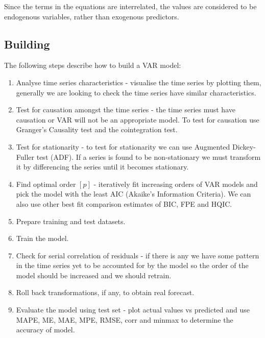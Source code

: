 \documentclass[11pt]{article}
\begin{document}
Since the terms in the equations are interrelated, the values are considered to be endogenous variables, rather than exogenous predictors.

\subsection{Building}
The following steps describe how to build a VAR model:

\vspace{-0.25cm}
\begin{enumerate}
	\itemsep-0.2cm
	\item Analyse time series characteristics - visualise the time series by plotting them, generally we are looking to check the time series have similar characteristics.
	\item Test for causation amongst the time series - the time series must have causation or VAR will not be an appropriate model. To test for causation use Granger's Causality test and the cointegration test.
	\item Test for stationarity - to test for stationarity we can use Augmented Dickey-Fuller test (ADF). If a series is found to be non-stationary we must transform it by differencing the series until it becomes stationary.
	\item Find optimal order $[p]$ - iteratively fit increasing orders of VAR models and pick the model with the least AIC (Akaike’s Information Criteria). We can also use other best fit comparison estimates of BIC, FPE and HQIC.
	\item Prepare training and test datasets.
	\item Train the model.
	\item Check for serial correlation of residuals -  if there is any we have some pattern in the time series yet to be accounted for by the model so the order of the model should be increased and we should retrain.
	\item Roll back transformations, if any, to obtain real forecast.
	\item Evaluate the model using test set - plot actual values vs predicted and use MAPE, ME, MAE, MPE, RMSE, corr and minmax to determine the accuracy of model.
\end{enumerate} 
\end{document}
